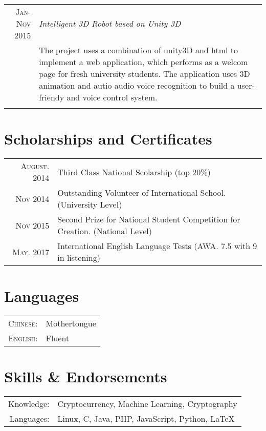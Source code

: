 \documentclass[a4paper,10pt]{article}
\begin{document}
\begin{tabular}{r|p{11cm}}
    \textsc{Jan-Nov 2015} & \emph{Intelligent 3D Robot based on Unity 3D} \\
  &\footnotesize{The project uses a combination of unity3D and html to implement a web application, which performs as a welcom page for fresh university students. The application uses 3D animation and autio audio voice recognition to build a user-friendy and voice control system.}\\
  \multicolumn{2}{c}{} \\

\end{tabular}


\section{Scholarships and Certificates}
\begin{tabular}{rl}
  \textsc{August.} 2014 & Third Class National Scolarship \footnotesize(top 20\%) \normalsize\\
  \textsc{Nov} 2014 & Outstanding Volunteer of International School. \footnotesize(University Level) \normalsize\\
  \textsc{Nov} 2015 & Second Prize for National Student Competition for Creation. \footnotesize(National Level) \normalsize\\
  \textsc{May.} 2017 & International English Language Tests \footnotesize(AWA. 7.5 with 9 in listening)\normalsize\\
\end{tabular}

\section{Languages}
\begin{tabular}{rl}
 \textsc{Chinese:}&Mothertongue\\
\textsc{English:}&Fluent\\
\end{tabular}

\section{Skills \& Endorsements}
\begin{tabular}{rl}
  Knowledge: &Cryptocurrency, Machine Learning, Cryptography\\
  Languages: &Linux, C, Java, PHP, JavaScript, Python, LaTeX\setmainfont[SmallCapsFont=Fontin-SmallCaps.otf]{Fontin.otf}
\end{tabular}
\end{document}
